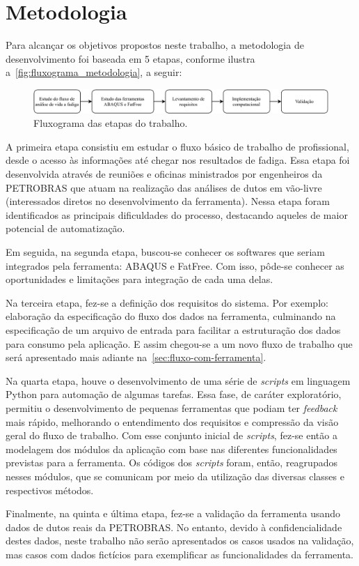 \thispagestyle{simple}
\chapter{Metodologia}\label{chap:metodologia}

Para alcançar os objetivos propostos neste trabalho, a metodologia de desenvolvimento foi baseada em 5 etapas, conforme ilustra a~\autoref{fig:fluxograma_metodologia}, a seguir:

\begin{figure}[!ht]
    \centering
    \caption{Fluxograma das etapas do trabalho.}\label{fig:fluxograma_metodologia}
    \includegraphics[width=\textwidth]{imagens/fluxograma_metodologia}
\end{figure}

A primeira etapa consistiu em estudar o fluxo básico de trabalho de profissional, desde o acesso às informações até chegar nos resultados de fadiga. Essa etapa foi desenvolvida através de reuniões e oficinas ministrados por engenheiros da PETROBRAS que atuam na realização das análises de dutos em vão-livre (interessados diretos no desenvolvimento da ferramenta). Nessa etapa foram identificados as principais dificuldades do processo, destacando aqueles de maior potencial de automatização.

Em seguida, na segunda etapa, buscou-se conhecer os softwares que seriam integrados pela ferramenta: ABAQUS e FatFree. Com isso, pôde-se conhecer as oportunidades e limitações para integração de cada uma delas. %

Na terceira etapa, fez-se a definição dos requisitos do sistema. Por exemplo: elaboração da especificação do fluxo dos dados na ferramenta, culminando na especificação de um arquivo de entrada para facilitar a estruturação dos dados para consumo pela aplicação. E assim chegou-se a um novo fluxo de trabalho que será apresentado mais adiante na~\autoref{sec:fluxo-com-ferramenta}.

Na quarta etapa, houve o desenvolvimento de uma série de \textit{scripts} em linguagem Python para automação de algumas tarefas.
Essa fase, de caráter exploratório, permitiu o desenvolvimento de pequenas ferramentas que podiam ter \textit{feedback} mais rápido, melhorando o entendimento dos requisitos e compressão da visão geral do fluxo de trabalho.
Com esse conjunto inicial de \textit{scripts}, fez-se então a modelagem dos módulos da aplicação com base nas diferentes funcionalidades previstas para a ferramenta.
Os códigos dos \textit{scripts} foram, então, reagrupados nesses módulos, que se comunicam por meio da utilização das diversas classes e respectivos métodos.

Finalmente, na quinta e última etapa, fez-se a validação da ferramenta usando dados de dutos reais da PETROBRAS\@.
No entanto, devido à confidencialidade destes dados, neste trabalho não serão apresentados os casos usados na validação, mas casos com dados fictícios para exemplificar as funcionalidades da ferramenta.